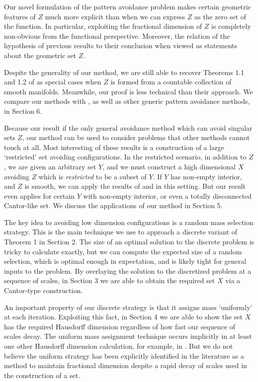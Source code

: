 \documentclass[dvipsnames]{article}
\theoremstyle{plain}
\theoremstyle{plain}
\begin{document}
Our novel formulation of the pattern avoidance problem makes certain geometric features of $Z$ much more explicit than when we can  express $Z$ as the zero set of the function. In particular, exploiting the fractional dimension of $Z$ is completely non-obvious from the functional perspective. Moreover, the relation of the hypothesis of previous results to their conclusion when viewed as statements about the geometric set $Z$.

Despite the generality of our method, we are still able to recover Theorems 1.1 and 1.2 of \cite{MalabikaRob} as special cases when $Z$ is formed from a countable collection of smooth manifolds. Meanwhile, our proof is less technical than their approach. We compare our methods with \cite{MalabikaRob}, as well as other generic pattern avoidance methods, in Section 6.

Because our result if the only general avoidance method which can avoid singular sets $Z$, our method can be used to consider problems that other methods cannot touch at all. Most interesting of these results is a construction of a large `restricted' set avoiding configurations. In the restricted scenario, in addition to $Z$, we are given an arbitrary set $Y$, and we must construct a high dimensional $X$ avoiding $Z$ which is {\it restricted} to be a subset of $Y$. If $Y$ has non-empty interior, and $Z$ is smooth, we can apply the results of \cite{MalabikaRob} and \cite{Mathe} in this setting. But our result even applies for certain $Y$ with non-empty interior, or even a totally disconnected Cantor-like set. We discuss the applications of our method in Section 5.

The key idea to avoiding low dimension configurations is a random mass selection strategy. This is the main technique we use to approach a discrete variant of Theorem 1 in Section 2. The size of an optimal solution to the discrete problem is tricky to calculate exactly, but we can compute the expected size of a random selection, which is optimal enough in expectation, and is likely tight for general inputs to the problem. By overlaying the solution to the discretized problem at a sequence of scales, in Section 3 we are able to obtain the required set $X$ via a Cantor-type construction.

An important property of our discrete strategy is that it assigns mass `uniformly' at each iteration. Exploiting this fact, in Section 4 we are able to show the set $X$ has the required Hausdorff dimension regardless of how fast our sequence of scales decay. The uniform mass assignment technique occurs implicitly in at least one other Hausdorff dimension calculation, for example, in \cite{MalabikaRob}. But we do not believe the uniform strategy has been explicitly identified in the literature as a method to maintain fractional dimension despite a rapid decay of scales used in the construction of a set.
\end{document}
